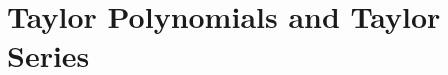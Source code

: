 \section{Taylor Polynomials and Taylor Series} \label{S:8.5.Taylor}



\newpage



\newpage



\newpage



\newpage



\newpage



\newpage



\newpage

\clearpage
